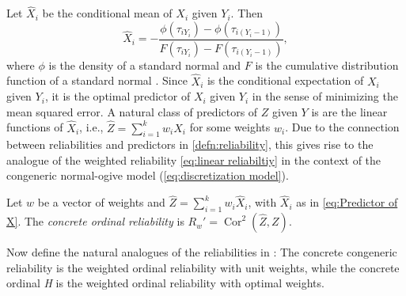 \documentclass[twoside]{article}
\DeclareMathOperator{\Cor}{Cor}
\begin{document}
Let $\hat{X}_{i}$ be the conditional mean of $X_i$ given $Y_i$. Then
\begin{equation}
\hat{X}_i=-\frac{\phi(\tau_{iY_{i}})-\phi(\tau_{i(Y_{i}-1)})}{F(\tau_{iY_{i}})-F(\tau_{i(Y_{i}-1)})},\label{eq:Predictor of X}
\end{equation}
where $\phi$ is the density of a standard normal and $F$ is the cumulative distribution function of a standard normal \citep[Section 10.1]{Johnson1994-ag}. Since $\hat{X}_{i}$ is the conditional expectation of $X_{i}$ given $Y_{i}$, it is the optimal predictor of $X_{i}$ given $Y_{i}$ in the sense of minimizing the mean squared error. A natural class of predictors of $Z$ given $Y$ is are the linear
functions of $\hat{X}_{i}$, i.e., $\hat{Z} = \sum_{i=1}^{k}w_{i}\hat{X}_{i}$ for some weights $w_{i}$. Due to the connection between reliabilities and predictors in \cref{defn:reliability}, this gives rise to the analogue of the weighted reliability \eqref{eq:linear reliabiltiy} in the context of the congeneric normal-ogive model (\ref{eq:discretization model}).
\begin{defn}\label{defn:concrete ordinal reliability}
Let $w$ be a vector of weights and $\hat{Z}=\sum_{i=1}^{k}w_{i}\hat{X}_{i}$, with $\hat{X}_i$ as in \eqref{eq:Predictor of X}. The \textit{concrete ordinal reliability} is $ R_{w}'=\Cor^2(\hat{Z},Z)$.
\end{defn}
Now define the natural analogues of the reliabilities in : The concrete congeneric reliability is the weighted ordinal reliability with unit weights, while the concrete ordinal \textit{H} is the weighted ordinal reliability with optimal weights.  
\end{document}
